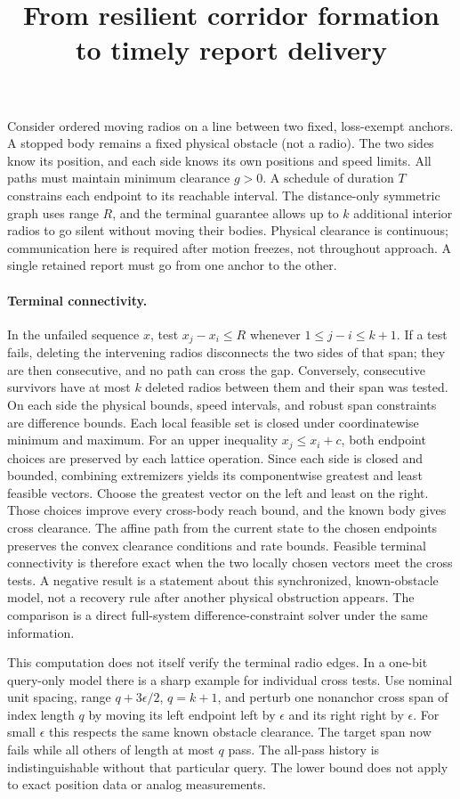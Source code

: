 \documentclass[11pt]{article}
\title{From resilient corridor formation to timely report delivery}
\author{}\date{}
\begin{document}
\maketitle
Consider ordered moving radios on a line between two fixed, loss-exempt
anchors. A stopped body remains a fixed physical obstacle (not a radio).
The two sides know its position, and each side knows its own positions
and speed limits. All paths must maintain minimum clearance $g>0$.
A schedule of duration $T$ constrains each endpoint to its reachable
interval. The distance-only symmetric graph uses range $R$, and the
terminal guarantee allows up to $k$ additional interior radios to go
silent without moving their bodies. Physical clearance is continuous;
communication here is required after motion freezes, not throughout
approach. A single retained report must go from one anchor to the other.

\paragraph{Terminal connectivity.}
In the unfailed sequence $x$, test $x_j-x_i\le R$ whenever
$1\le j-i\le k+1$. If a test fails, deleting the intervening radios
disconnects the two sides of that span; they are then consecutive,
and no path can cross the gap. Conversely, consecutive survivors have
at most $k$ deleted radios between them and their span was tested.
On each side the physical bounds, speed intervals, and robust span
constraints are difference bounds. Each local feasible set is closed
under coordinatewise minimum and maximum. For an upper inequality
$x_j\le x_i+c$, both endpoint choices are preserved by each lattice
operation. Since each side is closed and bounded, combining extremizers
yields its componentwise greatest and least feasible vectors. Choose the
greatest vector on the left and least on the right. Those choices improve
every cross-body reach bound, and the known body gives cross clearance.
The affine path from the current state to the chosen endpoints preserves
the convex clearance conditions and rate bounds. Feasible terminal
connectivity is therefore exact when the two locally chosen vectors
meet the cross tests. A negative result is a statement about this
synchronized, known-obstacle model, not a recovery rule after another
physical obstruction appears. The comparison is a direct full-system
difference-constraint solver under the same information.

This computation does not itself verify the terminal radio edges. In
a one-bit query-only model there is a sharp example for individual cross
tests. Use nominal unit spacing, range $q+3\epsilon/2$, $q=k+1$, and
perturb one nonanchor cross span of index length $q$ by moving its left
endpoint left by $\epsilon$ and its right right by $\epsilon$. For small
$\epsilon$ this respects the same known obstacle clearance. The target
span now fails while all others of length at most $q$ pass. The all-pass
history is indistinguishable without that particular query. The lower
bound does not apply to exact position data or analog measurements.
\end{document}
